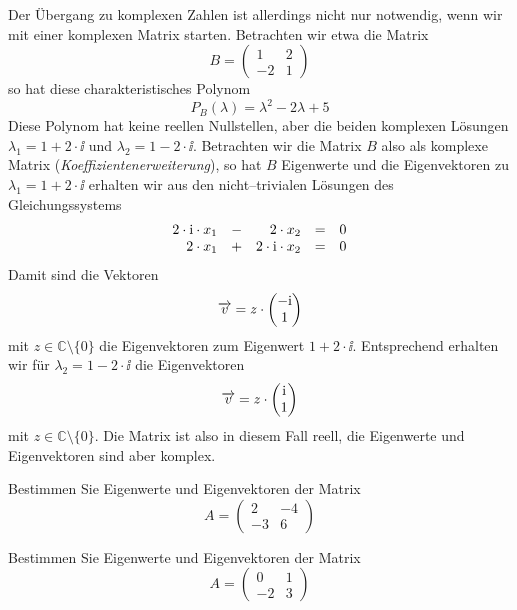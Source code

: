 \begin{notiz}
Der Übergang zu komplexen Zahlen ist allerdings nicht nur notwendig, wenn wir mit einer komplexen Matrix starten. 
Betrachten wir etwa die Matrix
  	$$ B = \left( \begin{matrix} 1 & 2 \\ -2 & 1 \end{matrix} \right) $$
so hat diese charakteristisches Polynom
 	$$ P_B(\lambda) = \lambda^2 - 2 \lambda + 5 $$
Diese Polynom hat keine reellen Nullstellen, aber die beiden komplexen Lösungen $\lambda_1 = 1 + 2 \cdot \ii$ und 
$\lambda_2 = 1 - 2 \cdot \ii$. Betrachten wir die Matrix $B$ also als komplexe Matrix (\textit{Koeffizientenerweiterung}), 
so hat $B$ Eigenwerte und die Eigenvektoren zu $\lambda_1 = 1+2\cdot \ii$ 
erhalten wir aus den nicht--trivialen Lösungen des Gleichungssystems
  	$$ \begin{array} {r c r c l}
  	2\cdot \ii \cdot x_1 & - & 2 \cdot x_2 & = & 0 \\ 2 \cdot x_1 & + & 2\cdot \ii \cdot x_2 & = & 0 
  	\end{array} $$
Damit sind die Vektoren 
  	$$ \vektor{v} = z \cdot  \left(\begin{matrix} -\ii \\ 1 \end{matrix} \right)$$
mit $z \in \mathbb C \setminus \{ 0 \}$ die Eigenvektoren zum Eigenwert $1+2 \cdot \ii$. Entsprechend erhalten wir 
für $\lambda_2 = 1-2\cdot \ii$ die Eigenvektoren
  	$$ \vektor{v} = z \cdot  \left(\begin{matrix} \ii \\ 1 \end{matrix} \right)$$
mit $z \in \mathbb C \setminus \{ 0 \}$. Die Matrix ist also in diesem Fall reell, die Eigenwerte und 
Eigenvektoren sind aber komplex.
\end{notiz}

\bigbreak

\begin{aufgabe} Bestimmen Sie Eigenwerte und Eigenvektoren der Matrix
  	$$ A = \left( \begin{matrix} 2 & - 4 \\ -3 & 6 \end{matrix} \right) $$
\end{aufgabe}

\begin{aufgabe} Bestimmen Sie Eigenwerte und Eigenvektoren der Matrix
  	$$ A = \left( \begin{matrix} 0 & 1 \\ -2 & 3 \end{matrix} \right) $$
\end{aufgabe}

